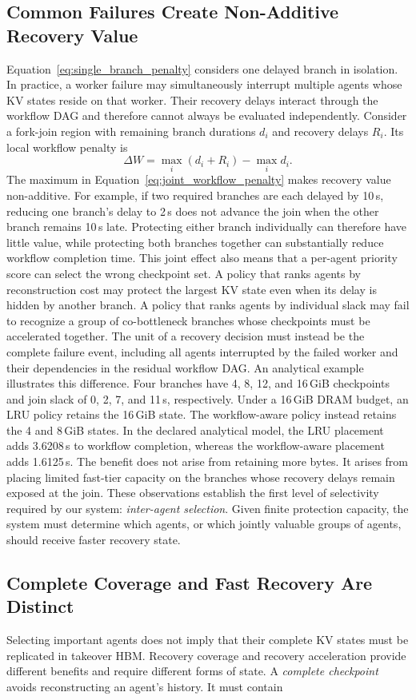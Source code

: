 \subsection{Common Failures Create Non-Additive Recovery Value} \label{sec:motivation:joint} Equation~\ref{eq:single_branch_penalty} considers one delayed branch in isolation. In practice, a worker failure may simultaneously interrupt multiple agents whose KV states reside on that worker. Their recovery delays interact through the workflow DAG and therefore cannot always be evaluated independently. Consider a fork-join region with remaining branch durations $d_i$ and recovery delays $R_i$. Its local workflow penalty is \begin{equation} \Delta W = \max_i \left(d_i + R_i\right) - \max_i d_i. \label{eq:joint_workflow_penalty} \end{equation} The maximum in Equation~\ref{eq:joint_workflow_penalty} makes recovery value non-additive. For example, if two required branches are each delayed by 10\,s, reducing one branch's delay to 2\,s does not advance the join when the other branch remains 10\,s late. Protecting either branch individually can therefore have little value, while protecting both branches together can substantially reduce workflow completion time. This joint effect also means that a per-agent priority score can select the wrong checkpoint set. A policy that ranks agents by reconstruction cost may protect the largest KV state even when its delay is hidden by another branch. A policy that ranks agents by individual slack may fail to recognize a group of co-bottleneck branches whose checkpoints must be accelerated together. The unit of a recovery decision must instead be the complete failure event, including all agents interrupted by the failed worker and their dependencies in the residual workflow DAG. An analytical example illustrates this difference. Four branches have 4, 8, 12, and 16\,GiB checkpoints and join slack of 0, 2, 7, and 11\,s, respectively. Under a 16\,GiB DRAM budget, an LRU policy retains the 16\,GiB state. The workflow-aware policy instead retains the 4 and 8\,GiB states. In the declared analytical model, the LRU placement adds 3.6208\,s to workflow completion, whereas the workflow-aware placement adds 1.6125\,s. The benefit does not arise from retaining more bytes. It arises from placing limited fast-tier capacity on the branches whose recovery delays remain exposed at the join. These observations establish the first level of selectivity required by our system: \emph{inter-agent selection}. Given finite protection capacity, the system must determine which agents, or which jointly valuable groups of agents, should receive faster recovery state. \subsection{Complete Coverage and Fast Recovery Are Distinct} \label{sec:motivation:coverage} Selecting important agents does not imply that their complete KV states must be replicated in takeover HBM. Recovery coverage and recovery acceleration provide different benefits and require different forms of state. A \emph{complete checkpoint} avoids reconstructing an agent's history. It must contain 